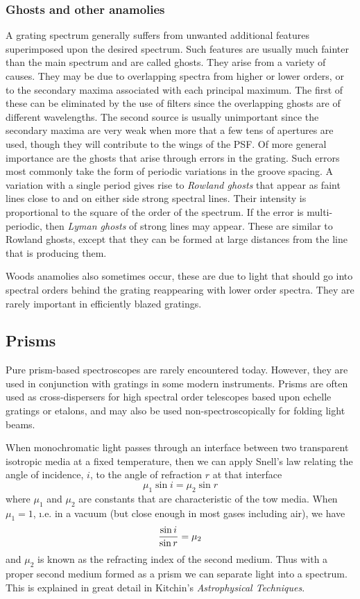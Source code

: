 \documentclass{article}
\begin{document}
\subsubsection{Ghosts and other anamolies}

A grating spectrum generally suffers from unwanted additional features superimposed upon the desired spectrum. Such features are usually much fainter than the main spectrum and are called ghosts. They arise from a variety of causes. They may be due
to overlapping spectra from higher or lower orders, or to the secondary maxima associated with each principal maximum. The first of these can be eliminated by the use
of filters since the overlapping ghosts are of different wavelengths. The second source
is usually unimportant since the secondary maxima are very weak when more that a few
tens of apertures are used, though they will contribute to the wings of the PSF. 
Of more general importance are the ghosts that arise through errors in the grating. 
Such errors most commonly take the form of periodic variations in the groove spacing.
A variation with a single period gives rise to {\it Rowland ghosts} that appear as faint
lines close to and on either side strong spectral lines. Their intensity is proportional to the square of the order of the spectrum. If the error is multi-periodic, then {\it Lyman ghosts} of strong lines may appear. These are similar to Rowland ghosts, except that they can be formed at large distances from the line that is producing them. 

Woods anamolies also sometimes occur, these are due to light that should go into spectral orders behind the grating reappearing with lower order spectra. They are rarely 
important in efficiently blazed gratings.

\subsection{Prisms}

Pure prism-based spectroscopes are rarely encountered today. However, they are used in 
conjunction with gratings in some modern instruments. Prisms are often used as cross-dispersers for high spectral order telescopes based upon echelle gratings or etalons, and may also be used non-spectroscopically for folding light beams.

When monochromatic light passes through an interface between two transparent isotropic
media at a fixed temperature, then we can apply Snell's law relating the angle of incidence, $i$, to the angle of refraction $r$ at that interface
\[ 
\mu_1\sin i=\mu_2\sin r
\]
where $\mu_1$ and $\mu_2$ are constants that are characteristic of the tow media. 
When $\mu_1=1$, {\i.e.} in a vacuum (but close enough in most gases including air), 
we have
\[
{\sin i\over\sin r}=\mu_2
\]
and $\mu_2$ is known as the refracting index of the second medium. Thus with a proper
second medium formed as a prism we can separate light into a spectrum. This is explained in great detail in Kitchin's {\it Astrophysical Techniques}.
\end{document}
